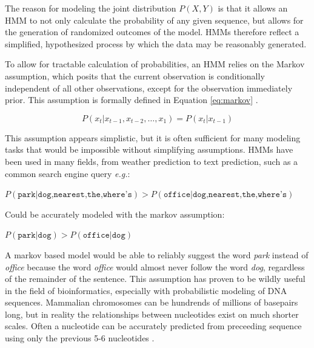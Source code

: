 The reason for modeling the joint distribution $P(X,Y)$ is that it allows an HMM to not only calculate the probability of any given sequence, but allows for the generation of randomized outcomes of the model. HMMs therefore reflect a simplified, hypothesized process by which the data may be reasonably generated.

To allow for tractable calculation of probabilities, an HMM relies on the Markov assumption, which posits that the current observation is conditionally independent of all other observations, except for the observation immediately prior. This assumption is formally defined in Equation \ref{eq:markov} \cite{Rabiner1989ARecognition}.

\begin{equation}
    P(x_t|x_{t-1},x_{t-2},\dots,x_1) = P(x_t | x_{t-1})
\label{eq:markov}
\end{equation}

This assumption appears simplistic, but it is often sufficient for many modeling tasks that would be impossible without simplifying assumptions. HMMs have been used in many fields, from weather prediction to text prediction, such as a common search engine query \emph{e.g.}: 

\begin{center}
    $P(\texttt{park} | \texttt{dog,nearest,the,where's}) > P(\texttt{office} | \texttt{dog,nearest,the,where's}) $
\end{center}

Could be accurately modeled with the markov assumption:

\begin{center}
    $P(\texttt{park} | \texttt{dog}) > P(\texttt{office} | \texttt{dog}) $
\end{center}

A markov based model would be able to reliably suggest the word \emph{park} instead of \emph{office} because the word \emph{office} would almost never follow the word \emph{dog}, regardless of the remainder of the sentence. This assumption has proven to be wildly useful in the field of bioinformatics, especially with probabilistic modeling of DNA sequences. Mammalian chromosomes can be hundrends of millions of basepairs long, but in reality the relationships between nucleotides exist on much shorter scales. Often a nucleotide can be accurately predicted from preceeding sequence using only the previous 5-6 nucleotides \cite{Burge1997PredictionDNA}.

